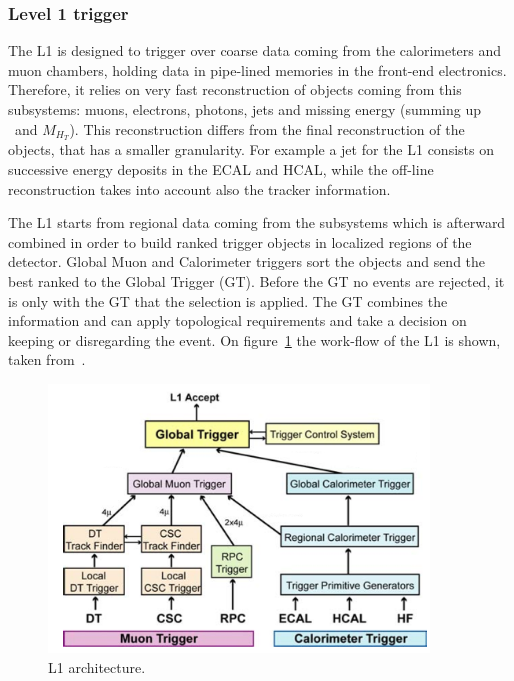 \subsubsection{Level 1 trigger}
\label{sec:L1}

The L1 is designed to trigger over coarse data coming from the calorimeters and muon chambers, holding data in pipe-lined memories in the front-end electronics. Therefore, it relies on very fast reconstruction of objects coming from this subsystems: muons, electrons, photons, jets and missing energy (summing up \HT~and $M_{H_{T}}$). This reconstruction differs from the final reconstruction of the objects, that has a smaller granularity. For example a jet for the L1 consists on successive energy deposits in the ECAL and HCAL, while the off-line reconstruction takes into account also the tracker information. 

The L1 starts from regional data coming from the subsystems which is afterward combined in order to build ranked trigger objects in localized regions of the detector. Global Muon and Calorimeter triggers sort the objects and send the best ranked to the Global Trigger (GT). Before the GT no events are rejected, it is only with the GT that the selection is applied. The GT combines the information and can apply topological requirements and take a decision on keeping or disregarding the event. On figure~\ref{fig:l1} the work-flow of the L1 is shown, taken from~\cite{Lenzi:2013xpa}. 

\begin{figure}[!Hhtbp]
  \begin{center}
    \includegraphics[width=0.9\textwidth]{figs/img_l1.png}
    \caption{L1 architecture.}
    \label{fig:l1}
  \end{center}
\end{figure}

